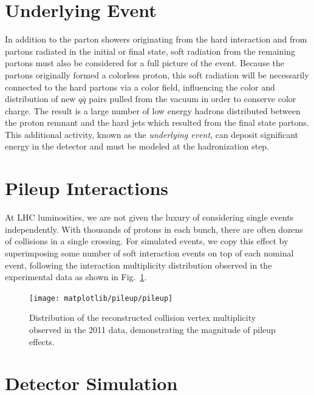 \section{Underlying Event}

In addition to the parton showers originating from the hard interaction and from partons radiated in the initial or final state, soft radiation from the remaining partons must also be considered for a full picture of the event.  Because the partons originally formed a colorless proton, this soft radiation will be necessarily connected to the hard partons via a color field, influencing the color and distribution of new $q\bar{q}$ pairs pulled from the vacuum in order to conserve color charge.  The result is a large number of low energy hadrons distributed between the proton remnant and the hard jets which resulted from the final state partons.  This additional activity, known as the \emph{underlying event}, can deposit significant energy in the detector and must be modeled at the hadronization step.

\section{Pileup Interactions}

At LHC luminosities, we are not given the luxury of considering single events independently.  With thousands of protons in each bunch, there are often dozens of collisions in a single crossing.  For simulated events, we copy this effect by superimposing some number of soft interaction events on top of each nominal event, following the interaction multiplicity distribution observed in the experimental data as shown in Fig.~\ref{fig:pileup}.

\begin{figure}
  \centering
  \texttt{[image: matplotlib/pileup/pileup]}
  \caption[Distribution of the reconstructed collision vertex multiplicity observed in the 2011 data]{Distribution of the reconstructed collision vertex multiplicity observed in the 2011 data, demonstrating the magnitude of pileup effects.}
  \label{fig:pileup}
\end{figure}


\section{Detector Simulation}

